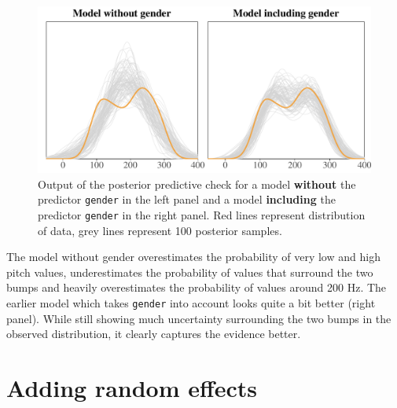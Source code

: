 \documentclass[nobib]{tufte-handout}
\begin{document}
\begin{figure}
  \centering
    \includegraphics[width = 1\textwidth]{pics/pp_checks_plot.pdf}
    \caption{Output of the posterior predictive check for a model \textbf{without} the predictor \texttt{gender} in the left panel and a model \textbf{including} the predictor \texttt{gender} in the right panel. Red lines represent distribution of data, grey lines represent 100 posterior samples.}
    \label{fig:PPC}
\end{figure}

The model without gender overestimates the probability of very low and high pitch values, underestimates the probability of values that surround the two bumps and heavily overestimates the probability of values around 200 Hz.
The earlier model which takes \texttt{gender} into account looks quite a bit better (right panel). While still showing much uncertainty surrounding the two bumps in the observed distribution, it clearly captures the evidence better. 



\section{Adding random effects}
\end{document}
